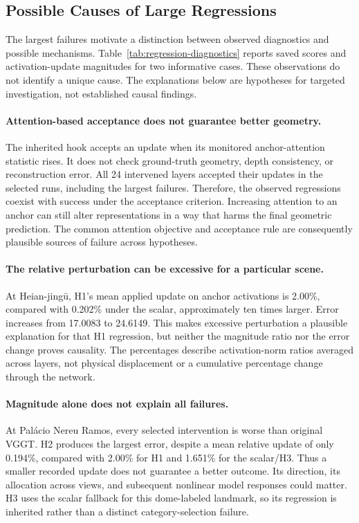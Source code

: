 \subsection{Possible Causes of Large Regressions}
\label{sec:regression-analysis}
The largest failures motivate a distinction between observed diagnostics and possible mechanisms. Table~\ref{tab:regression-diagnostics} reports saved scores and activation-update magnitudes for two informative cases. These observations do not identify a unique cause. The explanations below are hypotheses for targeted investigation, not established causal findings.

\paragraph{Attention-based acceptance does not guarantee better geometry.}
The inherited hook accepts an update when its monitored anchor-attention statistic rises. It does not check ground-truth geometry, depth consistency, or reconstruction error. All 24 intervened layers accepted their updates in the selected runs, including the largest failures. Therefore, the observed regressions coexist with success under the acceptance criterion. Increasing attention to an anchor can still alter representations in a way that harms the final geometric prediction. The common attention objective and acceptance rule are consequently plausible sources of failure across hypotheses.

\paragraph{The relative perturbation can be excessive for a particular scene.}
At Heian-jing\={u}, H1's mean applied update on anchor activations is 2.00\%, compared with 0.202\% under the scalar, approximately ten times larger. Error increases from 17.0083 to 24.6149. This makes excessive perturbation a plausible explanation for that H1 regression, but neither the magnitude ratio nor the error change proves causality. The percentages describe activation-norm ratios averaged across layers, not physical displacement or a cumulative percentage change through the network.

\paragraph{Magnitude alone does not explain all failures.}
At Pal\'acio Nereu Ramos, every selected intervention is worse than original VGGT. H2 produces the largest error, despite a mean relative update of only 0.194\%, compared with 2.00\% for H1 and 1.651\% for the scalar/H3. Thus a smaller recorded update does not guarantee a better outcome. Its direction, its allocation across views, and subsequent nonlinear model responses could matter. H3 uses the scalar fallback for this dome-labeled landmark, so its regression is inherited rather than a distinct category-selection failure.

